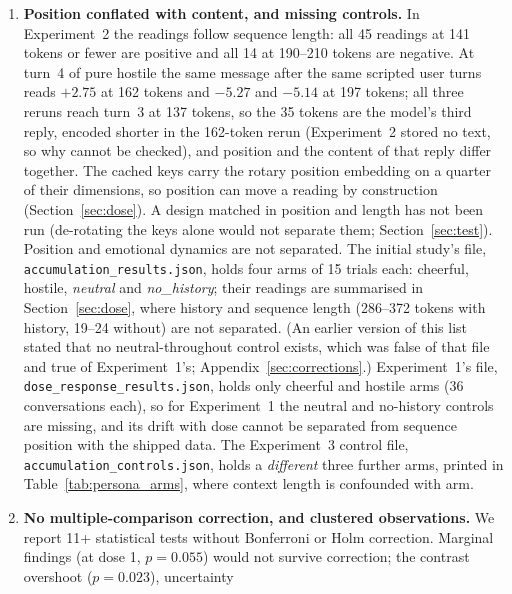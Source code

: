 \documentclass[11pt,a4paper]{article}
\begin{document}
\begin{enumerate}[nosep]
    \item \label{lim:position}\textbf{Position conflated with content, and missing controls.}
          In Experiment~2 the readings follow sequence length: all 45
          readings at 141 tokens or fewer are positive and all 14 at
          190--210 tokens are negative. At turn~4 of pure hostile the same message after the same scripted user turns reads $+2.75$ at 162 tokens and $-5.27$ and $-5.14$ at 197 tokens; all three reruns reach turn~3 at 137 tokens, so the 35 tokens are the model's third reply, encoded shorter in the 162-token rerun (Experiment~2 stored no text, so why cannot be checked), and position and the content of that reply differ together. The cached keys carry the rotary
          position embedding on a quarter of their dimensions, so position
          can move a reading by construction (Section~\ref{sec:dose}). A
          design matched in position and length has not been run
          (de-rotating the keys alone would not separate them;
          Section~\ref{sec:test}). Position and emotional dynamics are
          not separated. The initial study's file,
          \texttt{accumulation\_results.json}, holds four arms of 15 trials
          each: cheerful, hostile, \emph{neutral} and \emph{no\_history};
          their readings are summarised in Section~\ref{sec:dose}, where
          history and sequence length (286--372 tokens with history, 19--24
          without) are not separated. (An earlier version of this list
          stated that no neutral-throughout control exists, which was
          false of that file and true of Experiment~1's;
          Appendix~\ref{sec:corrections}.) Experiment~1's file,
          \texttt{dose\_response\_results.json}, holds only cheerful and
          hostile arms (36 conversations each), so for Experiment~1 the
          neutral and no-history controls are missing, and its drift with
          dose cannot be separated from sequence position with the shipped
          data. The Experiment~3 control file,
          \texttt{accumulation\_controls.json}, holds a \emph{different}
          three further arms, printed in Table~\ref{tab:persona_arms}, where
          context length is confounded with arm.
    \item \label{lim:multcomp}\textbf{No multiple-comparison correction, and clustered
          observations.} We report 11+
          statistical tests without Bonferroni or Holm correction.
          Marginal findings (at dose 1, $p{=}0.055$) would not survive
          correction; the contrast overshoot ($p{=}0.023$), uncertainty

\end{enumerate}
\end{document}
